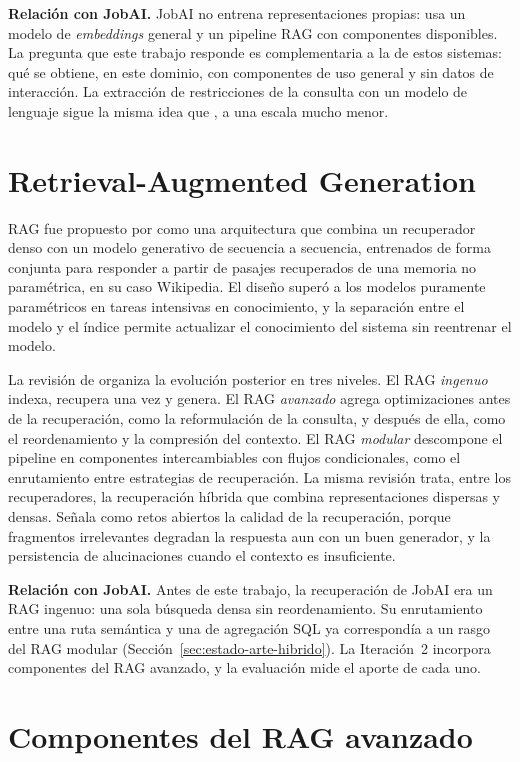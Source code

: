 \textbf{Relación con JobAI.} JobAI no entrena representaciones propias: usa un modelo de \textit{embeddings} general y un pipeline RAG con componentes disponibles. La pregunta que este trabajo responde es complementaria a la de estos sistemas: qué se obtiene, en este dominio, con componentes de uso general y sin datos de interacción. La extracción de restricciones de la consulta con un modelo de lenguaje sigue la misma idea que \citet{Liu2025}, a una escala mucho menor.

\section{Retrieval-Augmented Generation}
\label{sec:estado-arte-rag}

RAG fue propuesto por \citet{Lewis2020} como una arquitectura que combina un recuperador denso con un modelo generativo de secuencia a secuencia, entrenados de forma conjunta para responder a partir de pasajes recuperados de una memoria no paramétrica, en su caso Wikipedia. El diseño superó a los modelos puramente paramétricos en tareas intensivas en conocimiento, y la separación entre el modelo y el índice permite actualizar el conocimiento del sistema sin reentrenar el modelo.

La revisión de \citet{Gao2023} organiza la evolución posterior en tres niveles. El RAG \emph{ingenuo} indexa, recupera una vez y genera. El RAG \emph{avanzado} agrega optimizaciones antes de la recuperación, como la reformulación de la consulta, y después de ella, como el reordenamiento y la compresión del contexto. El RAG \emph{modular} descompone el pipeline en componentes intercambiables con flujos condicionales, como el enrutamiento entre estrategias de recuperación. La misma revisión trata, entre los recuperadores, la recuperación híbrida que combina representaciones dispersas y densas. Señala como retos abiertos la calidad de la recuperación, porque fragmentos irrelevantes degradan la respuesta aun con un buen generador, y la persistencia de alucinaciones cuando el contexto es insuficiente.

\textbf{Relación con JobAI.} Antes de este trabajo, la recuperación de JobAI era un RAG ingenuo: una sola búsqueda densa sin reordenamiento. Su enrutamiento entre una ruta semántica y una de agregación SQL ya correspondía a un rasgo del RAG modular (Sección~\ref{sec:estado-arte-hibrido}). La Iteración~2 incorpora componentes del RAG avanzado, y la evaluación mide el aporte de cada uno.

\section{Componentes del RAG avanzado}
\label{sec:estado-arte-componentes}

